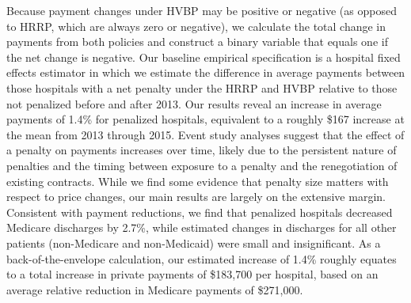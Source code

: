 \documentclass[12pt]{article}
\begin{document}
Because payment changes under HVBP may be positive or negative (as opposed to HRRP, which are always zero or negative), we calculate the total change in payments from both policies and construct a binary variable that equals one if the net change is negative.  Our baseline empirical specification is a hospital fixed effects estimator in which we estimate the difference in average payments between those hospitals with a net penalty under the HRRP and HVBP relative to those not penalized before and after 2013. Our results reveal an increase in average payments of 1.4\% for penalized hospitals, equivalent to a roughly \$167 increase at the mean from 2013 through 2015. Event study analyses suggest that the effect of a penalty on payments increases over time, likely due to the persistent nature of penalties and the timing between exposure to a penalty and the renegotiation of existing contracts.  While we find some evidence that penalty size matters with respect to price changes, our main results are largely on the extensive margin. Consistent with payment reductions, we find that penalized hospitals decreased Medicare discharges by 2.7\%, while estimated changes in discharges for all other patients (non-Medicare and non-Medicaid) were small and insignificant. As a back-of-the-envelope calculation, our estimated increase of 1.4\% roughly equates to a total increase in private payments of \$183,700 per hospital, based on an average relative reduction in Medicare payments of \$271,000.
\end{document}
